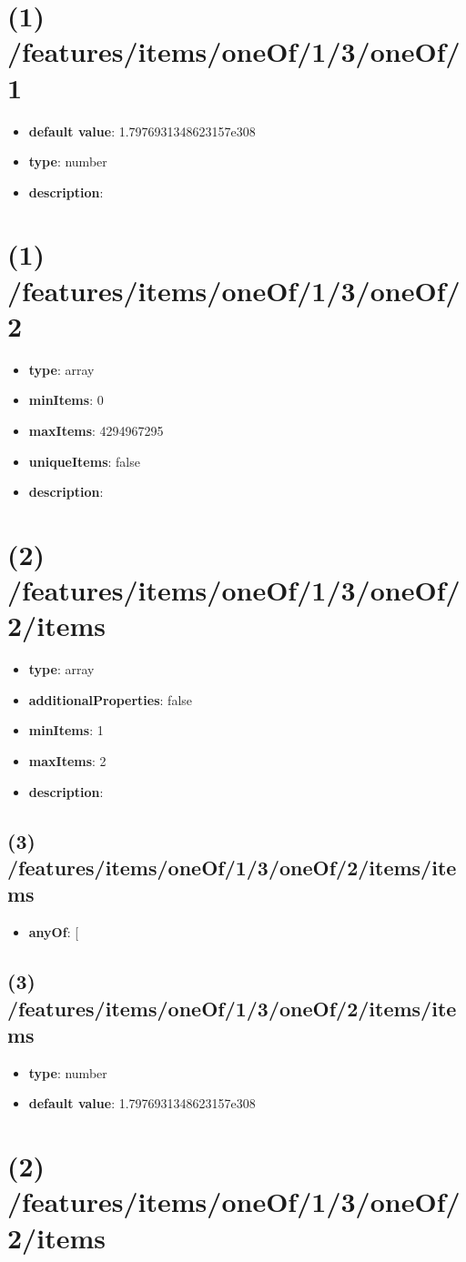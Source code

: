 \section{(1) /features/items/oneOf/1/3/oneOf/1}
\begin{itemize}[leftmargin=1em]\item {\bf default value}: 1.7976931348623157e308
\item {\bf type}: number
\item {\bf description}: 
\end{itemize}\section{(1) /features/items/oneOf/1/3/oneOf/2}
\begin{itemize}[leftmargin=1em]\item {\bf type}: array
\item {\bf minItems}: 0
\item {\bf maxItems}: 4294967295
\item {\bf uniqueItems}: false
\item {\bf description}: 
\end{itemize}\section{(2) /features/items/oneOf/1/3/oneOf/2/items}
\begin{itemize}[leftmargin=2em]\item {\bf type}: array
\item {\bf additionalProperties}: false
\item {\bf minItems}: 1
\item {\bf maxItems}: 2
\item {\bf description}: 
\end{itemize}\subsection{(3) /features/items/oneOf/1/3/oneOf/2/items/items}
\begin{itemize}[leftmargin=3em]\item {\bf anyOf}: [\end{itemize}\subsection{(3) /features/items/oneOf/1/3/oneOf/2/items/items}
\begin{itemize}[leftmargin=3em]\item {\bf type}: number\item {\bf default value}: 1.7976931348623157e308
\end{itemize}\section{(2) /features/items/oneOf/1/3/oneOf/2/items}
